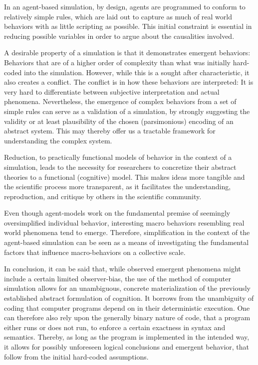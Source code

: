 In an agent-based simulation, by design, agents are programmed to conform to relatively simple rules, which are laid out to capture as much of real world behaviors with as little scripting as possible. This initial constraint is essential in reducing possible variables in order to argue about the causalities involved. 

A desirable property of a simulation is that it demonstrates emergent behaviors: Behaviors that are of a higher order of complexity than what was initially hard-coded into the simulation. However, while this is a sought after characteristic, it also creates a conflict. The conflict is in how these behaviors are interpreted: It is very hard to differentiate between subjective interpretation and actual phenomena. Nevertheless, the emergence of complex behaviors from a set of simple rules can serve as a validation of a simulation, by strongly suggesting the validity or at least plausibility of the chosen (parsimonious) encoding of an abstract system. This may thereby offer us a tractable framework for understanding the complex system.

Reduction, to practically functional models of behavior in the context of a simulation, leads to the necessity for researchers to concretize their abstract theories to a functional (cognitive) model. This makes ideas more tangible and the scientific process more transparent, as it facilitates the understanding, reproduction, and critique by others in the scientific community. 

Even though agent-models work on the fundamental premise of seemingly oversimplified individual behavior, interesting macro behaviors resembling real world phenomena tend to emerge. Therefore, simplification in the context of the agent-based simulation can be seen as a means of investigating the fundamental factors that influence macro-behaviors on a collective scale. 

In conclusion, it can be said that, while observed emergent phenomena might include a certain limited observer-bias, the use of the method of computer simulation allows for an unambiguous, concrete materialization of the previously established abstract formulation of cognition. It borrows from the unambiguity of coding that computer programs depend on in their deterministic execution. One can therefore also rely upon the generally binary nature of code, that a program either runs or does not run, to enforce a certain exactness in syntax and semantics. Thereby, as long as the program is implemented in the intended way, it allows for possibly unforeseen logical conclusions and emergent behavior, that follow from the initial hard-coded assumptions.

